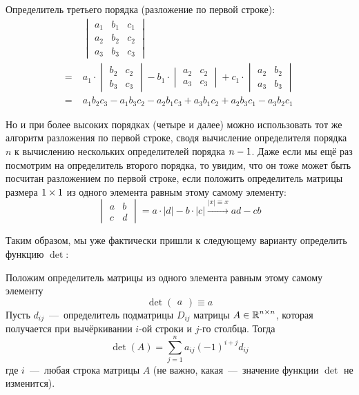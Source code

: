 \documentclass[a4paper,12pt]{article}
\begin{document}
  \begin{example}
    Определитель третьего порядка (разложение по первой строке):
    \begin{equation}
    \label{eq:third-order-det-fy-first-line}
    \begin{split}
      &\begin{vmatrix}
        a_1 & b_1 & c_1\\
        a_2 & b_2 & c_2\\
        a_3 & b_3 & c_3
      \end{vmatrix}\\
        =\; &a_1 \cdot \begin{vmatrix}b_2 & c_2\\b_3 & c_3\end{vmatrix}
        - b_1 \cdot \begin{vmatrix}a_2 & c_2\\a_3 & c_3\end{vmatrix}
        + c_1 \cdot \begin{vmatrix}a_2 & b_2\\a_3 & b_3\end{vmatrix}\\
        =\; &a_1 b_2 c_3 - a_1 b_3 c_2 - a_2 b_1 c_3 + a_3 b_1 c_2 + a_2 b_3 c_1 - a_3 b_2 c_1
    \end{split}
    \end{equation}
  \end{example}
  
  Но и при более высоких порядках (четыре и далее) можно использовать тот же алгоритм разложения по первой строке, сводя вычисление определителя порядка $n$ к вычислению нескольких определителей порядка $n \hm- 1$.
  Даже если мы ещё раз посмотрим на определитель второго порядка, то увидим, что он тоже может быть посчитан разложением по первой строке, если положить определитель матрицы размера $1 \hm\times 1$ из одного элемента равным этому самому элементу:
  \[
    \begin{vmatrix}
      a & b\\
      c & d
    \end{vmatrix}
    = a \cdot |d| - b \cdot |c|
    \xrightarrow{|x| \equiv x} ad - cb
  \]
  
  Таким образом, мы уже фактически пришли к следующему варианту определить функцию $\det$:
  
  \begin{definition}
    Положим определитель матрицы из одного элемента равным этому самому элементу
    \[
      \det \begin{pmatrix}a\end{pmatrix} \equiv a
    \]
    Пусть $d_{ij}$~---~определитель подматрицы $D_{ij}$ матрицы $A \in \operatorname{\mathbb R}^{n \times n}$, которая получается при вычёркивании $i$-ой строки и $j$-го столбца.
    Тогда
    \[
      \det(A) = \sum\limits_{j = 1}^n a_{ij} (-1)^{i + j} d_{ij}
    \]
    где $i$~---~любая строка матрицы $A$ (не важно, какая~---~значение функции $\det$ не изменится).
  \end{definition}
  
\end{document}
